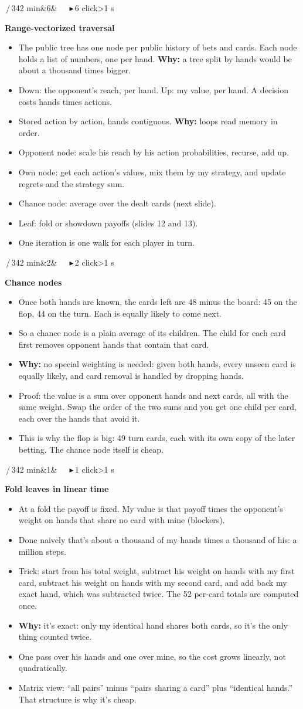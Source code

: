 \documentclass{article}
\newcommand{\slide}[4]{\clearpage
  \noindent\colorbox{bar}{\parbox{\dimexpr\linewidth-2\fboxsep}{\color{white}\fontsize{13}{15}\selectfont
  \textbf{\fontsize{21}{23}\selectfont #1}\,/\,34\hfill #3\ifx&#4&\else\ \ \ \textcolor{ck!40!white}{\ensuremath{\blacktriangleright}}\,#4 click\ifnum#4>1 s\fi\fi\\[2pt]
  \raggedright\textbf{\fontsize{15}{17.5}\selectfont #2}}}\par\vspace{5pt}
  \fontsize{15}{17.8}\selectfont\raggedright}
\newcommand{\pt}{\item[\textbullet]}
\newcommand{\ck}{\item[\textcolor{ck}{\ensuremath{\blacktriangleright}}]}
\newcommand{\why}{\textcolor{why}{\textbf{Why:}} }
\begin{document}
\slide{10}{Range-vectorized traversal}{2 min}{6}
\begin{itemize}
\pt The public tree has one node per public history of bets and cards. Each node holds a list of numbers, one per hand. \why a tree split by hands would be about a thousand times bigger.
\ck Down: the opponent's reach, per hand. Up: my value, per hand. A decision costs hands times actions.
\ck Stored action by action, hands contiguous. \why loops read memory in order.
\ck Opponent node: scale his reach by his action probabilities, recurse, add up.
\ck Own node: get each action's values, mix them by my strategy, and update regrets and the strategy sum.
\ck Chance node: average over the dealt cards (next slide).
\ck Leaf: fold or showdown payoffs (slides 12 and 13).
\pt One iteration is one walk for each player in turn.
\end{itemize}

\slide{11}{Chance nodes}{2 min}{2}
\begin{itemize}
\pt Once both hands are known, the cards left are 48 minus the board: 45 on the flop, 44 on the turn. Each is equally likely to come next.
\ck So a chance node is a plain average of its children. The child for each card first removes opponent hands that contain that card.
\pt \why no special weighting is needed: given both hands, every unseen card is equally likely, and card removal is handled by dropping hands.
\ck Proof: the value is a sum over opponent hands and next cards, all with the same weight. Swap the order of the two sums and you get one child per card, each over the hands that avoid it.
\pt This is why the flop is big: 49 turn cards, each with its own copy of the later betting. The chance node itself is cheap.
\end{itemize}

\slide{12}{Fold leaves in linear time}{2 min}{1}
\begin{itemize}
\pt At a fold the payoff is fixed. My value is that payoff times the opponent's weight on hands that share no card with mine (blockers).
\pt Done naively that's about a thousand of my hands times a thousand of his: a million steps.
\pt Trick: start from his total weight, subtract his weight on hands with my first card, subtract his weight on hands with my second card, and add back my exact hand, which was subtracted twice. The 52 per-card totals are computed once.
\pt \why it's exact: only my identical hand shares both cards, so it's the only thing counted twice.
\pt One pass over his hands and one over mine, so the cost grows linearly, not quadratically.
\ck Matrix view: ``all pairs'' minus ``pairs sharing a card'' plus ``identical hands.'' That structure is why it's cheap.
\end{itemize}
\end{document}
